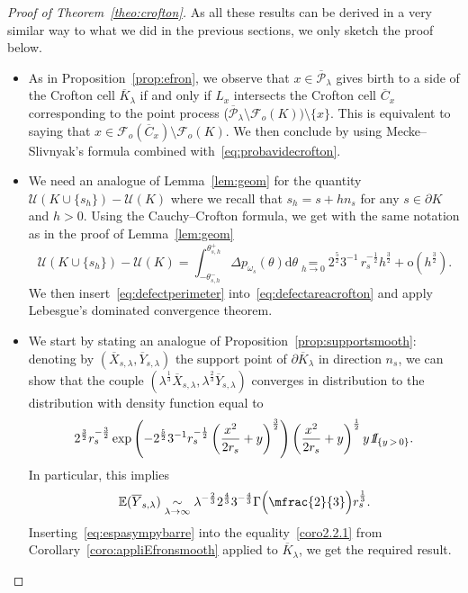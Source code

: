 \documentclass[AHL,Unicode,longabstracts,published]{cedram}
\newcommand{\indicat}{{\text{1}}\negthickspace\text{I}}
\newcommand{\cF}{\mathcal{F}}
\newcommand{\cP}{\mathcal{P}}
\newcommand{\cU}{\mathcal{U}}
\newcommand{\dd}{\mathrm{d}}
\newcommand{\od}{\mathrm{o}}
\newcommand{\E}{\mathbb{E}}
\newcommand*{\MK}{\mkern 2mu}
\begin{document}
\begin{proof}[{Proof of Theorem~\ref{theo:crofton}}]
As all these results can be derived in a very similar way to what we did in the previous sections, we only sketch the proof below.
\begin{itemize}
\item[\eqref{theo7.1.a}] As in Proposition~\ref{prop:efron}, we observe that $x\in \overline{\cP}_\lambda$ gives birth to a side of the Crofton cell $\overline{K}_{\lambda}$ if and only if $L_x$ intersects the Crofton cell $\overline{C}_x$ corresponding to the point process ($\overline{\cP}_\lambda\setminus \cF_o(K))\setminus\{x\}$. This is equivalent to saying that $x\in {\cF}_o(\overline{C}_x)\setminus\cF_o(K)$. We then conclude by using Mecke--Slivnyak's formula combined with~\eqref{eq:probavidecrofton}.\\

\item[\eqref{theo7.1.b}$\MK$\eqref{theo7.1.b.1}] We need an analogue of Lemma~\ref{lem:geom} for the quantity $\cU(K\cup\{s_h\})-\cU(K)$ where we recall that $s_h=s+hn_s$ for any $s\in \partial K$ and $h>0$. Using the Cauchy--Crofton formula, we get with the same notation as in the proof of Lemma~\ref{lem:geom}
\begin{equation}\label{eq:defectperimeter}
\cU(K\cup\{s_h\})-\cU(K) =\int_{-\theta_{s,h}^-}^{\theta_{s,h}^+}\Delta p_{\omega_s}(\theta)\dd\theta
\underset{h\to 0}{=}2^{\frac{5}{2}}3^{-1}\, r_s^{-\frac1{2}} h^{\frac{3}{2}}+ \od\left(h^{\frac32}\right).
\end{equation}
We then insert~\eqref{eq:defectperimeter} into~\eqref{eq:defectareacrofton} and apply Lebesgue's dominated convergence theorem.
\pagebreak

\item[\eqref{theo7.1.b}$\MK$\eqref{theo7.1.b.2}] We start by stating an analogue of Proposition~\ref{prop:supportsmooth}: denoting by $(\overline{X}_{s,\lambda},\overline{Y}_{s,\lambda})$ the support point of $\partial \overline{K}_{\lambda}$ in direction $n_s$, we can show that the couple $(\lambda^{\frac1{3}}\overline{X}_{s,\lambda}, \lambda^{\frac{2}{3}}\overline{Y}_{s,\lambda})$ converges in distribution to the distribution with density function equal to
\[
2^{\frac{3}{2}} r_s^{-\frac{3}{2}}\exp\left(-2^{\frac{5}{2}} 3^{-1}r_s^{-\frac1{2}}
\left(\frac{x^2}{2r_s}+y\right)^{\frac{3}{2}}\right)\left(\frac{x^2}{2r_s}+y\right)^{\frac1{2}}y{\emph{\indicat}}_{\{y\,>\,0\}}.
\]
In particular, this implies
\begin{equation}\label{eq:espasympybarre}
\E(\overline{Y}_{s,\lambda})\underset{\lambda\to\infty}{\sim}\lambda^{-\frac{2}{3}}2^{\frac43}3^{-\frac{4}{3}}\Gamma\Big(\mfrac{2}{3}\Big) r_s^{\frac1{3}}.
\end{equation}
Inserting~\eqref{eq:espasympybarre} into the equality~\eqref{coro2.2.1} from Corollary~\ref{coro:appliEfronsmooth} applied to $\overline{K}_{\lambda}$, we get the required result.\\


\end{itemize}
\end{proof}
\end{document}
